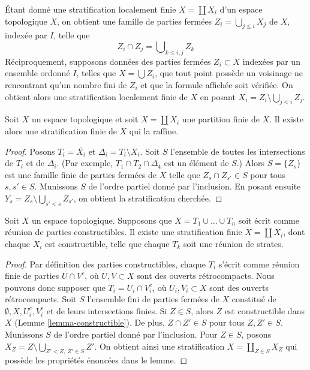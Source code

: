 \begin{remark}
\label{remark-locally-finite-stratification}
Étant donné une stratification localement finie $X = \coprod X_i$ d'un
espace topologique $X$, on obtient une famille de parties fermées
$Z_i = \bigcup_{j \leq i} X_j$ de $X$, indexée par $I$, telle que
$$
Z_i \cap Z_j = \bigcup\nolimits_{k \leq i, j} Z_k
$$
Réciproquement, supposons données des parties fermées $Z_i \subset X$
indexées par un ensemble ordonné $I$, telles que $X = \bigcup Z_i$, que tout
point possède un voisinage ne rencontrant qu'un nombre fini de $Z_i$ et que la
formule affichée soit vérifiée. On obtient alors une stratification localement
finie de $X$ en posant $X_i = Z_i \setminus \bigcup_{j < i} Z_j$.
\end{remark}

\begin{lemma}
\label{lemma-partition-refined-by-stratification}
Soit $X$ un espace topologique et soit $X = \coprod X_i$ une partition finie
de $X$. Il existe alors une stratification finie de $X$ qui la raffine.
\end{lemma}

\begin{proof}
Posons $T_i = \overline{X_i}$ et $\Delta_i = T_i \setminus X_i$.
Soit $S$ l'ensemble de toutes les intersections de $T_i$ et de $\Delta_i$.
(Par exemple, $T_1 \cap T_2 \cap \Delta_4$ est un élément de $S$.)
Alors $S = \{Z_s\}$ est une famille finie de parties fermées de $X$ telle que
$Z_s \cap Z_{s'} \in S$ pour tous $s, s' \in S$. Munissons $S$ de l'ordre
partiel donné par l'inclusion. En posant ensuite
$Y_s = Z_s \setminus \bigcup_{s' < s} Z_{s'}$, on obtient la stratification
cherchée.
\end{proof}

\begin{lemma}
\label{lemma-constructible-partition-refined-by-stratification}
Soit $X$ un espace topologique. Supposons que
$X = T_1 \cup \ldots \cup T_n$ soit écrit comme réunion de parties
constructibles. Il existe une stratification finie
$X = \coprod X_i$, dont chaque $X_i$ est constructible, telle que chaque
$T_k$ soit une réunion de strates.
\end{lemma}

\begin{proof}
Par définition des parties constructibles, chaque $T_i$ s'écrit comme réunion
finie de parties $U \cap V^c$, où $U, V \subset X$ sont des ouverts
rétrocompacts. Nous pouvons donc supposer que $T_i = U_i \cap V_i^c$,
où $U_i, V_i \subset X$ sont des ouverts rétrocompacts. Soit $S$ l'ensemble
fini de parties fermées de $X$ constitué de
$\emptyset, X, U_i^c, V_i^c$ et de leurs intersections finies.
Si $Z \in S$, alors $Z$ est constructible dans $X$
(Lemme \ref{lemma-constructible}).
De plus, $Z \cap Z' \in S$ pour tous $Z, Z' \in S$.
Munissons $S$ de l'ordre partiel donné par l'inclusion. Pour $Z \in S$, posons
$X_Z = Z \setminus \bigcup_{Z' < Z,\ Z' \in S} Z'$.
On obtient ainsi une stratification $X = \coprod_{Z \in S} X_Z$
qui possède les propriétés énoncées dans le lemme.
\end{proof}


